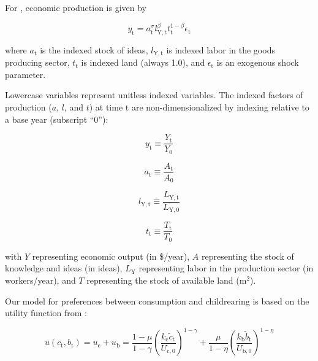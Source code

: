\documentclass[letterpaper,12pt]{article}
\begin{document}
For \citet{Jones:2001wn}, economic production is given by

\begin{equation} \label{eq:Jones_production_function}
	y_\mathrm{t} = a_\mathrm{t} ^\sigma l_\mathrm{Y,t} ^\beta t_\mathrm{t} ^{1-\beta} \epsilon_\mathrm{t}
\end{equation}

\noindent where $a_\mathrm{t}$ is the indexed stock of ideas, $l_\mathrm{Y,t}$ is indexed labor in the goods producing sector, $t_\mathrm{t}$ is indexed land (always 1.0), and $\epsilon_\mathrm{t}$ is an exogenous shock parameter. 

Lowercase variables represent unitless indexed variables. The indexed factors of production ($a$, $l$, and $t$) at time $\mathrm{t}$ are non-dimensionalized by indexing relative to a base year (subscript ``0''):

\begin{equation} \label{eq:index_y}
	y_\mathrm{t} \equiv \frac{Y_\mathrm{t}}{Y_\mathrm{0}}
\end{equation}

\begin{equation} \label{eq:index_a}
	a_\mathrm{t} \equiv \frac{A_\mathrm{t}}{A_\mathrm{0}}
\end{equation}

\begin{equation} \label{eq:index_l}
	l_\mathrm{Y,t} \equiv \frac{L_\mathrm{Y,t}}{L_\mathrm{Y,0}}
\end{equation}

\begin{equation} \label{eq:index_t}
	t_\mathrm{t} \equiv \frac{T_\mathrm{t}}{T_\mathrm{0}}
\end{equation}

\noindent with $Y$ representing economic output (in \$/year), $A$ representing the stock of knowledge and ideas (in ideas), $L_\mathrm{Y}$ representing labor in the production sector (in workers/year), and $T$ representing the stock of available land ($\mathrm{m}^2$).

Our model for preferences between consumption and childrearing is based on the utility function from \citet{Jones:2001wn}:

\begin{equation} \label{eq:utility_function}
	u(c_\mathrm{t}, b_\mathrm{t}) = u_\mathrm{c} + u_\mathrm{b} = \frac{1-\mu}{1-\gamma} \left(\frac{k_\mathrm{c} \tilde c_\mathrm{t}}{U_\mathrm{c,0}} \right)^{1-\gamma} + \frac{\mu}{1-\eta} \left(\frac{k_\mathrm{b} \tilde b_\mathrm{t}}{U_\mathrm{b,0}} \right)^{1-\eta}
\end{equation}
\end{document}
